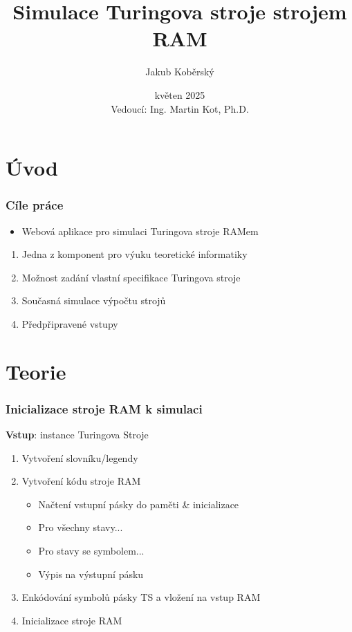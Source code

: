 \documentclass{beamer}
\title[Simulace Turingova stroje strojem RAM]{Simulace Turingova stroje strojem RAM}
\author{Jakub Koběrský}
\date[15.~3.~2025]{květen 2025\\Vedoucí: Ing. Martin Kot, Ph.D.}
\begin{document}


\section{Úvod}
\begin{frame} 
	\frametitle{Cíle práce}
	\begin{itemize}
		\item<1-> Webová aplikace pro simulaci Turingova stroje RAMem
	\end{itemize}
    \bigskip
    \begin{enumerate}
        \item<1-> Jedna z komponent pro výuku teoretické informatiky
        \item<1-> Možnost zadání vlastní specifikace Turingova stroje
        \item<1-> Současná simulace výpočtu strojů
        \item<1-> Předpřipravené vstupy
    \end{enumerate}
\end{frame}

\section{Teorie}
\begin{frame} 
	\frametitle{Inicializace stroje RAM k simulaci}
    \textbf{Vstup}: instance Turingova Stroje
    \bigskip
    \begin{enumerate}
        \item Vytvoření slovníku/legendy
        \item Vytvoření kódu stroje RAM
        \begin{itemize}
            \item Načtení vstupní pásky do paměti \& inicializace
            \item Pro všechny stavy... 
            \item Pro stavy se symbolem...
            \item Výpis na výstupní pásku
        \end{itemize}
        \item Enkódování symbolů pásky TS a vložení na vstup RAM
        \item Inicializace stroje RAM
    \end{enumerate}
	
\end{frame}
\end{document}
